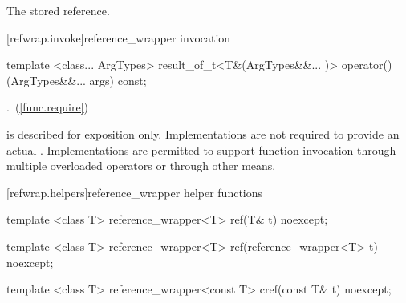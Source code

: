 \begin{itemdescr}
\pnum\returns The stored reference.
\end{itemdescr}


[refwrap.invoke]{reference_wrapper invocation}

%
%
\begin{itemdecl}
template <class... ArgTypes>
  result_of_t<T&(ArgTypes&&... )>
    operator()(ArgTypes&&... args) const;
\end{itemdecl}

\begin{itemdescr}
\pnum\returns {}.~(\ref{func.require})

\pnum\note {} is described for exposition only.
Implementations are not required to provide an actual
.  Implementations are
permitted to support  function invocation
through multiple overloaded operators or through other means.

\end{itemdescr}


[refwrap.helpers]{reference_wrapper helper functions}

%
%
\begin{itemdecl}
template <class T> reference_wrapper<T> ref(T& t) noexcept;
\end{itemdecl}

\begin{itemdescr}
\pnum\returns {}
\end{itemdescr}

%
%
\begin{itemdecl}
template <class T> reference_wrapper<T> ref(reference_wrapper<T> t) noexcept;
\end{itemdecl}

\begin{itemdescr}
\pnum\returns {}
\end{itemdescr}

%
%
\begin{itemdecl}
template <class T> reference_wrapper<const T> cref(const T& t) noexcept;
\end{itemdecl}

